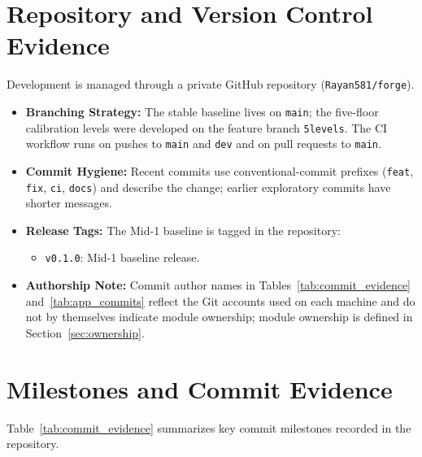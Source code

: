 \section{Repository and Version Control Evidence}
Development is managed through a private GitHub repository (\texttt{Rayan581/forge}). 
\begin{itemize}
    \item \textbf{Branching Strategy:} The stable baseline lives on \texttt{main}; the five-floor calibration levels were developed on the feature branch \texttt{5levels}. The CI workflow runs on pushes to \texttt{main} and \texttt{dev} and on pull requests to \texttt{main}.
    \item \textbf{Commit Hygiene:} Recent commits use conventional-commit prefixes (\texttt{feat}, \texttt{fix}, \texttt{ci}, \texttt{docs}) and describe the change; earlier exploratory commits have shorter messages.
    \item \textbf{Release Tags:} The Mid-1 baseline is tagged in the repository:
    \begin{itemize}
        \item \texttt{v0.1.0}: Mid-1 baseline release.
    \end{itemize}
    \item \textbf{Authorship Note:} Commit author names in Tables~\ref{tab:commit_evidence} and~\ref{tab:app_commits} reflect the Git accounts used on each machine and do not by themselves indicate module ownership; module ownership is defined in Section~\ref{sec:ownership}.
\end{itemize}

\section{Milestones and Commit Evidence}
Table~\ref{tab:commit_evidence} summarizes key commit milestones recorded in the repository.

